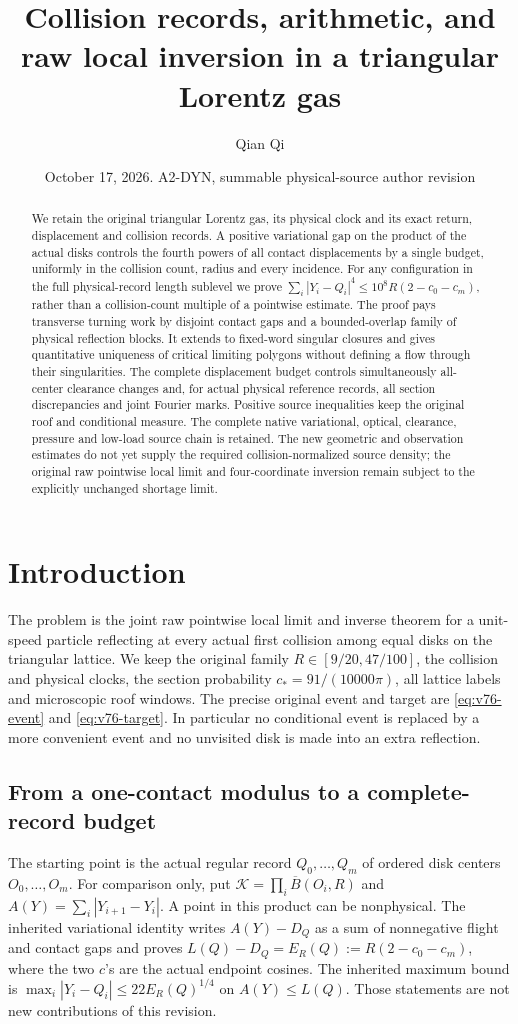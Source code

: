 \documentclass[11pt,reqno]{amsart}
\title[Collision records and raw local inversion]{Collision records, arithmetic, and raw local inversion in a triangular Lorentz gas}
\author{Qian Qi}
\date{October 17, 2026. A2-DYN, summable physical-source author revision}
\numberwithin{equation}{section}
\theoremstyle{definition}\newtheorem{definition}[theorem]{Definition}
\theoremstyle{remark}\newtheorem{remark}[theorem]{Remark}
\begin{document}
\raggedbottom
\begin{abstract}
We retain the original triangular Lorentz gas, its physical clock and
its exact return, displacement and collision records. A positive
variational gap on the product of the actual disks controls the
fourth powers of all contact displacements by a single budget,
uniformly in the collision count, radius and every incidence. For
any configuration in the full physical-record length sublevel we prove
$\sum_i|Y_i-Q_i|^4\le10^8R(2-c_0-c_m)$, rather than a collision-count
multiple of a pointwise estimate. The proof pays transverse turning
work by disjoint contact gaps and a bounded-overlap family of physical
reflection blocks. It extends to fixed-word singular closures and
gives quantitative uniqueness of critical limiting polygons without
defining a flow through their singularities. The complete displacement
budget controls simultaneously all-center clearance changes and, for
actual physical reference records, all section discrepancies and joint
Fourier marks. Positive source inequalities keep the original roof and
conditional measure. The complete native variational, optical,
clearance, pressure and low-load source chain is retained. The new
geometric and observation estimates do not yet supply the required
collision-normalized source density; the original raw pointwise local
limit and four-coordinate inversion remain subject to the explicitly
unchanged shortage limit.
\end{abstract}
\maketitle

\section*{Introduction}
The problem is the joint raw pointwise local limit and inverse theorem
for a unit-speed particle reflecting at every actual first collision
among equal disks on the triangular lattice. We keep the original
family $R\in[9/20,47/100]$, the collision and physical clocks, the
section probability $c_*=91/(10000\pi)$, all lattice labels and
microscopic roof windows. The precise original event and target are
\eqref{eq:v76-event} and \eqref{eq:v76-target}. In particular no
conditional event is replaced by a more convenient event and no
unvisited disk is made into an extra reflection.

\subsection*{From a one-contact modulus to a complete-record budget}
The starting point is the actual regular record
$Q_0,\ldots,Q_m$ of ordered disk centers $O_0,\ldots,O_m$. For
comparison only, put $\mathcal K=\prod_i\overline B(O_i,R)$ and
$A(Y)=\sum_i|Y_{i+1}-Y_i|$. A point in this product can be
nonphysical. The inherited variational identity writes $A(Y)-D_Q$
as a sum of nonnegative flight and contact gaps and proves
$L(Q)-D_Q=E_R(Q):=R(2-c_0-c_m)$, where the two $c$'s are the
actual endpoint cosines. The inherited maximum bound is
$\max_i|Y_i-Q_i|\le22E_R(Q)^{1/4}$ on $A(Y)\le L(Q)$.
Those statements are not new contributions of this revision.
\end{document}
